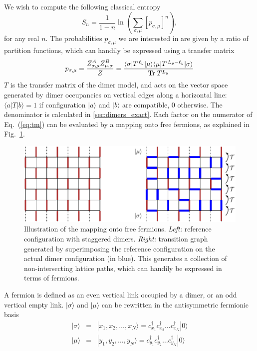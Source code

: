 \documentclass[11pt]{iopart}
\begin{document}
We wish to compute the following classical entropy
\begin{equation}
 S_n=\frac{1}{1-n} \ln \left(\sum_{\sigma,\mu} [p_{\sigma,\mu}]^n\right), 
\end{equation}
for any real $n$. The probabilities $p_{\sigma,\mu}$ we are interested in are given by a ratio of partition functions, which can handily be expressed using a transfer matrix
\begin{equation}\label{eq:tm}
 p_{\sigma,\mu}=\frac{Z_{\sigma,\mu}^A Z_{\mu,\sigma}^B}{Z}=\frac{\langle  \sigma|T^{\,\ell_y}|\mu\rangle\langle \mu|T^{\,L_y-\ell_y}|\sigma\rangle}{{\rm Tr}\; T^{L_y}}
\end{equation}
$T$ is the transfer matrix of the dimer model, and acts on the vector space generated by dimer occupancies on vertical edges along a horizontal line: $\langle a|T|b\rangle=1$ if configuration $|a\rangle$ and $|b\rangle$ are compatible, $0$ otherwise. The denominator is calculated in \ref{sec:dimers_exact}. Each factor on the numerator of Eq.~(\ref{eq:tm}) can be evaluated by a mapping onto free fermions\cite{Lieb1967,Alet_dimers2,Shannonee}, as explained in Fig.~\ref{fig:freefermions}.  
\begin{figure}[ht]
\begin{center}
\includegraphics{./figures/free_fermions.pdf}
  \end{center}
  \caption{Illustration of the mapping onto free fermions. \emph{Left:} reference configuration with staggered dimers. \emph{Right:} transition graph generated by superimposing the reference configuration on the actual dimer configuration (in blue). This generates a collection of non-intersecting lattice paths, which can handily be expressed in terms of fermions. }
  \label{fig:freefermions}
  \end{figure}
A fermion is defined as an even vertical link occupied by a dimer, or an odd vertical empty link. $|\sigma\rangle$ and $|\mu\rangle$ can be rewritten in the antisymmetric fermionic basis
\begin{eqnarray}
|\sigma \rangle&=&|x_1,x_2,\ldots,x_N\rangle=c_{x_1}^\dag c_{x_2}^\dag \ldots c_{x_N}^\dag |0\rangle \\
|\mu \rangle&=&|y_1,y_2,\ldots,y_N\rangle=c_{y_1}^\dag c_{y_2}^\dag \ldots c_{y_N}^\dag |0\rangle
\end{eqnarray}
\end{document}
